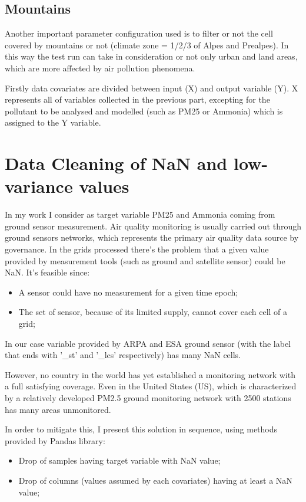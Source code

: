 \subsection{Mountains}
Another important parameter configuration used is to filter or not the cell covered by mountains or not (climate zone = 1/2/3 of Alpes and Prealpes). In this way the test run can take in consideration or not only urban and land areas, which are more affected by air pollution phenomena.

Firstly data covariates are divided between input (X) and output variable (Y). X represents all of variables collected in the previous part, excepting for the pollutant to be analysed and modelled (such as PM25 or Ammonia) which is assigned to the Y variable.


\section{Data Cleaning of NaN and low-variance values }
\label{subsec:nan}
In my work I consider as target variable PM25 and Ammonia coming from ground sensor measurement.
Air quality monitoring is usually carried out through ground sensors networks, which represents the primary air quality data source by governance. \newline
In the grids processed there's the problem that a given value provided by measurement tools (such as ground and satellite sensor) could be NaN. 
It's feasible since:
\begin{itemize}
\item A sensor could have no measurement for a given time epoch;
\item The set of sensor, because of its limited supply, cannot cover each cell of a grid;
\end{itemize}
In our case variable provided by ARPA and ESA ground sensor (with the label that ends with '\_st' and '\_lcs' respectively) has many NaN cells.
\par
However, no country in the world has yet established a monitoring network with a full satisfying coverage\cite{liu2018improve}. Even in the United States (US), which is characterized by a relatively developed PM2.5 ground monitoring network with 2500 stations has many areas unmonitored\cite{liu2018improve}. \par
In order to mitigate this, I present this solution in sequence, using methods provided by Pandas library:
\begin{itemize}
\item Drop of samples having target variable with NaN value;
\item Drop of columns (values assumed by each covariates) having at least a NaN value;
\end{itemize}
